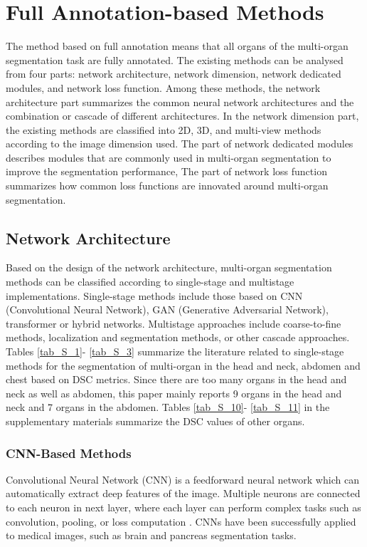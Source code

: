 \documentclass[lettersize,journal]{IEEEtran}
\begin{document}
\section{Full Annotation-based Methods}
\label{sec4}
The method based on full annotation means that all organs of the multi-organ segmentation task are fully annotated. The existing methods can be analysed from four parts: network architecture, network dimension, network dedicated modules, and network loss function. Among these methods, the network architecture part summarizes the common neural network architectures and the combination or cascade of different architectures. In the network dimension part, the existing methods are classified into 2D, 3D, and multi-view methods according to the image dimension used. The part of network dedicated modules describes modules that are commonly used in multi-organ segmentation to improve the segmentation performance, The part of network loss function summarizes how common loss functions are innovated around multi-organ segmentation.

\subsection{Network Architecture}
\label{sec4_1}
Based on the design of the network architecture, multi-organ segmentation methods can be classified according to single-stage and multistage implementations. Single-stage methods include those based on CNN (Convolutional Neural Network), GAN (Generative Adversarial Network), transformer or hybrid networks. Multistage approaches include coarse-to-fine methods, localization and segmentation methods, or other cascade approaches. Tables \ref{tab_S_1}- \ref{tab_S_3} summarize the literature related to single-stage methods for the segmentation of multi-organ in the head and neck, abdomen and chest based on DSC metrics. Since there are too many organs in the head and neck as well as abdomen, this paper mainly reports 9 organs in the head and neck and 7 organs in the abdomen. Tables  \ref{tab_S_10}- \ref{tab_S_11} in the supplementary materials summarize the DSC values of other organs.

\subsubsection{CNN-Based Methods}
Convolutional Neural Network (CNN) is a feedforward neural network which can automatically extract deep features of the image. Multiple neurons are connected to each neuron in next layer, where each layer can perform complex tasks such as convolution, pooling, or loss computation \cite{92}. CNNs have been successfully applied to medical images, such as brain \cite{93,94} and pancreas \cite{55} segmentation tasks.
\end{document}
